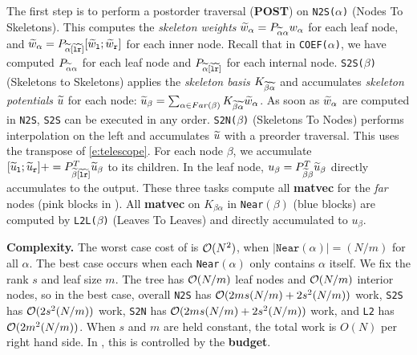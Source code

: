 The first step is to perform a postorder traversal (\textbf{POST}) on 
\texttt{N2S($\alpha$)} (Nodes To Skeletons).
This computes the \emph{skeleton weights} ${\widetilde{w}}_{\alpha}=P_{{\widetilde{\alpha}}\alpha}w_{\alpha}$
for each leaf node, and 
${\widetilde{w}}_{\alpha} = P_{{\widetilde{\alpha}}[{\widetilde{{\tt l}}}{\widetilde{{\tt r}}}]}[ {\widetilde{w}}_{{\tt l}}; {\widetilde{w}}_{{\tt r}}]$
for each inner node.
Recall that in \texttt{COEF($\alpha$)}, we have computed $P_{{\widetilde{\alpha}}\alpha}$
for each leaf node and $P_{{\widetilde{\alpha}}[{\widetilde{{\tt l}}}{\widetilde{{\tt r}}}]}$ for each 
internal node. 
\texttt{S2S($\beta$)} (Skeletons to Skeletons) applies the \emph{skeleton basis} $K_{{\widetilde{\beta}}{\widetilde{\alpha}}}$
and accumulates \emph{skeleton potentials} ${\widetilde{u}}$ for each node:
${\widetilde{u}}_{\beta}=\sum_{\alpha\in Far(\beta)}
K_{{\widetilde{\beta}}{\widetilde{\alpha}}}{\widetilde{w}}_{\alpha}$.
As soon as ${\widetilde{w}}_{\alpha}$ are computed in \texttt{N2S}, \texttt{S2S} can
be executed in any order.
\texttt{S2N($\beta$)} (Skeletons To Nodes) performs interpolation on the left
and accumulates
${\widetilde{u}}$ with a preorder traversal. This uses the transpose of
\eqref{e:telescope}.
For each node $\beta$, we accumulate
$[{\widetilde{u}}_{{\tt l}};{\widetilde{u}}_{{\tt r}}] +=
P_{{\widetilde{\beta}}[{\widetilde{{\tt l}}}{\widetilde{{\tt r}}}]}^{T}{\widetilde{u}}_{\beta}$ to its children.
In the leaf node, $u_{\beta} = P_{{\widetilde{\beta}}\beta}^{T}{\widetilde{u}}_{\beta}$
directly accumulates to the output.
These three tasks compute all \textbf{matvec} for the \emph{far} nodes (pink
blocks in ).
All \textbf{matvec} on $K_{\beta\alpha}$ in \texttt{Near}$(\beta)$ (blue blocks)
are computed by \texttt{L2L($\beta$)} (Leaves To Leaves) and directly accumulated to $u_{\beta}$.

\textbf{Complexity.}
The worst case cost of  is ${\mathcal O}(N^2)$, when 
$\lvert\mathtt{Near}(\alpha)\rvert=(N/m)$ for all $\alpha$.
The best case occurs when each \texttt{Near}$(\alpha)$ only contains $\alpha$ itself.
We fix the rank $s$ and %
leaf size $m$.
The tree has ${\mathcal O}(N/m)$ leaf nodes and ${\mathcal O}(N/m)$ interior nodes, so in the best case,
overall
\texttt{N2S} has ${\mathcal O}(2ms(N/m)+2s^2(N/m))$ work,
\texttt{S2S} has  ${\mathcal O}(2s^2(N/m))$ work,
\texttt{S2N} has ${\mathcal O(2ms(N/m)+2s^2(N/m))}$ work,
and \texttt{L2} has ${\mathcal O}(2m^2(N/m))$.
When $s$ and $m$ are held constant, the total work is $O(N)$ per right hand side.
In \gofmm{}, this is controlled by the \textbf{budget}.

